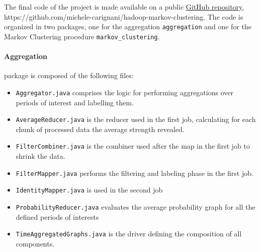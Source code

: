 The final code of the project is made available on a public \href{https://github.com/michele-carignani/hadoop-markov-clustering}{GitHub repository}, https://github.com/michele-carignani/hadoop-markov-clustering.
The code is organized in two packages, one for the aggregation \texttt{aggregation} and one for the Markov Clustering procedure \texttt{markov_clustering}.

\paragraph{Aggregation} package is composed of the following files:
\begin{itemize}
\item \texttt{Aggregator.java} comprises the logic for performing aggregations over periods of interest and labelling them.
\item \texttt{AverageReducer.java} is the reducer used in the first job, calculating for each chunk of processed data the average strength revealed.
\item \texttt{FilterCombiner.java} is the combiner used after the map in the first job to shrink the data.
\item \texttt{FilterMapper.java} performs the filtering and labeling phase in the first job.
\item \texttt{IdentityMapper.java} is used in the second job
\item \texttt{ProbabilityReducer.java} evaluates the average probability graph for all the defined periods of interests
\item \texttt{TimeAggregatedGraphs.java} is the driver defining the composition of all components.
\end{itemize}

